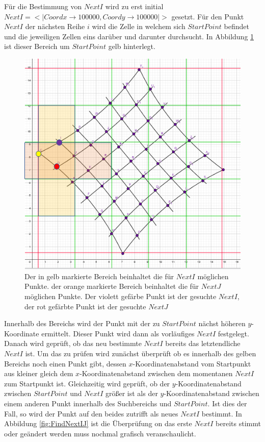 Für die Bestimmung von $NextI$ wird zu erst initial $NextI = <|Coordx \rightarrow 100 000, Coordy \rightarrow 100 000|>$ gesetzt. Für den Punkt $NextI$ der nächsten Reihe $i$ wird die Zelle in welchem sich $StartPoint$ befindet und die jeweiligen Zellen eins darüber und darunter durchsucht. In Abbildung \ref{fig:NextINextJ} ist dieser Bereich um $StartPoint$ gelb hinterlegt. 



\begin{figure}[!htb]
	\centering
	\includegraphics[width=0.6\linewidth]{images/VerzeichnetesSchachbrett_2.png}
	\caption[Finden der Startvektoren in Schachbrettpunkten]{Der in gelb markierte Bereich beinhaltet die für $NextI$ möglichen Punkte. der orange markierte Bereich beinhaltet die für $NextJ$ möglichen Punkte. Der violett gefärbe Punkt ist der gesuchte $NextI$, der rot gefärbte Punkt ist der gesuchte $NextJ$}
	\label{fig:NextINextJ}
\end{figure}


%

Innerhalb des Bereichs wird der Punkt mit der zu $StartPoint$ nächst höheren $y$-Koordinate ermittelt. Dieser Punkt wird dann als vorläufiges $NextI$ festgelegt. Danach wird geprüft, ob das neu bestimmte $NextI$ bereits das letztendliche $NextI$ ist. Um das zu prüfen wird zunächst überprüft ob es innerhalb des gelben Bereichs noch einen Punkt gibt, dessen $x$-Koordinatenabstand vom Startpunkt aus kleiner gleich dem $x$-Koordinatenabstand zwischen dem momentanen $NextI$ zum Startpunkt ist. Gleichzeitig wird geprüft, ob der $y$-Koordinatenabstand zwischen $StartPoint$ und $NextI$ größer ist als der $y$-Koordinatenabstand zwischen einem anderen Punkt innerhalb des Suchbereichs und $StartPoint$. Ist dies der Fall, so wird der Punkt auf den beides zutrifft als neues $NextI$ bestimmt. In Abbildung \ref{fig:FindNextIJ} ist die Überprüfung on das erste $NextI$ bereits stimmt oder geändert werden muss nochmal grafisch veranschaulicht.\\

